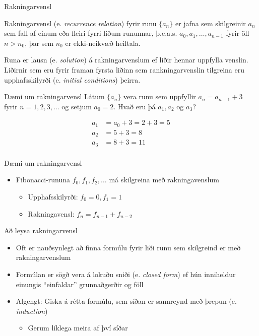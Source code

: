 \documentclass[handout]{beamer}
\begin{document}
\begin{frame}{Rakningarvensl}
\begin{tcolorbox}[title=Rakningarvensl]
Rakningarvensl (e. \emph{recurrence relation}) fyrir runu $\{a_n\}$ er jafna sem skilgreinir $a_n$ sem fall af einum eða fleiri fyrri liðum rununnar, þ.e.a.s. $a_0, a_1, \ldots, a_{n-1}$ fyrir öll $n > n_0$, þar sem $n_0$ er ekki-neikvæð heiltala.
\end{tcolorbox}
Runa er lausn (e. \emph{solution}) á rakningarvenslum ef liðir hennar uppfylla venslin. Liðirnir sem eru fyrir framan fyrsta liðinn sem rankningarvenslin tilgreina eru upphafsskilyrði (e. \emph{initial conditions}) þeirra.
\end{frame}

\begin{frame}{Dæmi um rakningarvensl}
Látum $\{a_n\}$ vera runu sem uppfyllir $a_n = a_{n-1} + 3$ fyrir $n=1, 2, 3, \ldots$ og setjum $a_0 = 2$. Hvað eru þá $a_1, a_2$ og $a_3$? \pause

\begin{align*}
a_1 &= a_0 + 3 = 2 + 3 = 5\\
a_2 &= 5 + 3 = 8\\
a_3 &= 8 + 3 = 11\\
\end{align*}

\end{frame}

\begin{frame}{Dæmi um rakningarvensl}
\begin{itemize}
 \item Fibonacci-rununa $f_0, f_1, f_2, \ldots$ má skilgreina með rakningavenslum
 \begin{itemize}
  \item Upphafsskilyrði: $f_0 = 0, f_1 = 1$
  \item Rakningavensl: $f_n = f_{n-1} + f_{n-2}$
 \end{itemize}
\end{itemize}
\end{frame}

\begin{frame}{Að leysa rakningarvensl}
\begin{itemize}
 \item Oft er nauðsynlegt að finna formúlu fyrir liði runu sem skilgreind er með rakningarvenslum
 \item Formúlan er sögð vera á lokuðu sniði (e. \emph{closed form}) ef hún inniheldur einungis ``einfaldar'' grunnaðgerðir og föll
 \item Algengt: Giska á rétta formúlu, sem síðan er sannreynd með þrepun (e. \emph{induction})
 \begin{itemize}
  \item Gerum líklega meira af því síðar
 \end{itemize}
\end{itemize}
\end{frame}
\end{document}
